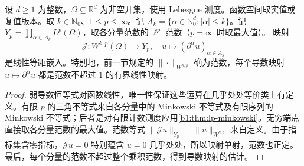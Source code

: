 \begin{proposition}\label{b1:prop:sobolev-derivative-embedding}
设 \(d\geq1\) 为整数，\(\Omega\subseteq\mathbb R^d\) 为非空开集，使用 Lebesgue 测度。函数空间取实值或复值版本。取 \(k\in\mathbb N_0\)、\(1\leq p\leq\infty\)。记 \(A_k=\{\alpha\in\mathbb N_0^d:|\alpha|\leq k\}\)。记 \(Y_p=\prod_{\alpha\in A_k}L^p(\Omega)\)，取各分量范数的 \(\ell^p\) 范数（\(p=\infty\) 时取最大值）。
映射
\[
 \mathcal J:W^{k,p}(\Omega)\longrightarrow Y_p,
 \quad u\longmapsto(\partial^\alpha u)_{\alpha\in A_k}
\]
是线性等距嵌入。特别地，前一节规定的 \(\|\cdot\|_{W^{k,p}}\) 确为范数，每个导数映射
\(u\mapsto\partial^\alpha u\) 都是范数不超过 \(1\) 的有界线性映射。
\end{proposition}
\begin{proof}
弱导数恒等式对函数线性，唯一性保证这些运算在几乎处处等价类上有定义。有限 \(p\) 的三角不等式来自各分量中的 Minkowski 不等式及有限序列的 Minkowski 不等式；后者是对有限计数测度应用\cref{b1:thm:lp-minkowski}。无穷端点直接取各分量范数的最大值。范数等式
\(\|\mathcal Ju\|_{Y_p}=\|u\|_{W^{k,p}}\) 来自定义。由于指标集含零指标，\(\mathcal Ju=0\) 特别蕴含 \(u=0\) 几乎处处，所以映射单射，范数也正定。最后，每个分量的范数不超过整个乘积范数，得到导数映射的估计。
\end{proof}

